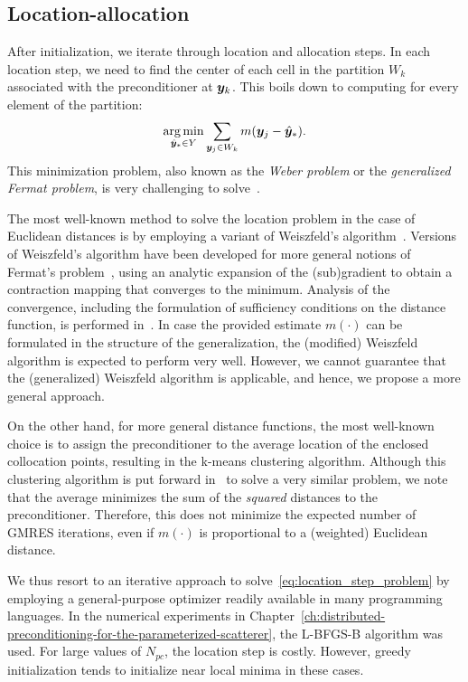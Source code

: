 \subsection{Location-allocation}\label{subsec:location}
After initialization, we iterate through location and allocation steps.
In each location step, we need to find the center of each cell in the partition $W_k$ associated with the preconditioner at ${\bm{y}}_k$.
This boils down to computing for every element of the partition:
\begin{equation}
    \operatorname*{arg\,min}_{{\hat{\bm{y}}_\ast}\in Y} \sum_{{\bm{y}}_j \in W_k} m({\bm{y}}_j -  {\hat{\bm{y}}_\ast}). \label{eq:location_step_problem}
\end{equation}
This minimization problem, also known as the \emph{Weber problem} or the \emph{generalized Fermat problem}, is very challenging to solve~\cite{brimberg2008,kalczynski2024}.

The most well-known method to solve the location problem in the case of Euclidean distances is by employing a variant of Weiszfeld's algorithm~\cite{cooper1981,weiszfeld1937}.
Versions of Weiszfeld's algorithm have been developed for more general notions of Fermat's problem~\cite{eckhardt1980,drezner2009}, using an analytic expansion of the (sub)gradient to obtain a contraction mapping that converges to the minimum.
Analysis of the convergence, including the formulation of sufficiency conditions on the distance function, is performed in~\cite{drezner2009}.
In case the provided estimate $m(\cdot)$ can be formulated in the structure of the generalization, the (modified) Weiszfeld algorithm is expected to perform very well.
However, we cannot guarantee that the (generalized) Weiszfeld algorithm is applicable, and hence, we propose a more general approach.

On the other hand, for more general distance functions, the most well-known choice is to assign the preconditioner to the average location of the enclosed collocation points, resulting in the k-means clustering algorithm.
Although this clustering algorithm is put forward in~\cite{graham2021} to solve a very similar problem, we note that the average minimizes the sum of the \emph{squared} distances to the preconditioner.
Therefore, this does not minimize the expected number of GMRES iterations, even if $m(\cdot)$ is proportional to a (weighted) Euclidean distance.

We thus resort to an iterative approach to solve~\eqref{eq:location_step_problem} by employing a general-purpose optimizer readily available in many programming languages.
In the numerical experiments in Chapter~\ref{ch:distributed-preconditioning-for-the-parameterized-scatterer}, the L-BFGS-B algorithm was used.
For large values of $N_{pc}$, the location step is costly.
However, greedy initialization tends to initialize near local minima in these cases.

